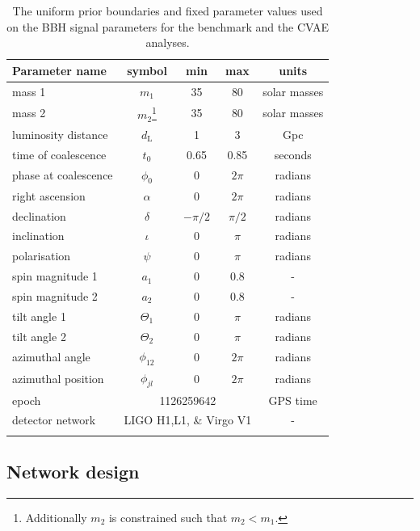 \documentclass[%
showpacs,
nofootinbib,
 amsmath,amssymb,
 aps,
 twocolumn,
 prl,
 reprint,
floatfix,
]{revtex4-1}
\begin{document}
%
%
\begin{table}
\centering
\caption{The uniform prior boundaries and fixed parameter values used on the \ac{BBH} signal parameters for the benchmark
and the \ac{CVAE} analyses.}
\begin{tabular}[t]{lcccc}
\toprule
Parameter name & symbol & min & max & units \\
\hline
mass 1 & $m_1$ & 35 & 80 & solar masses \\
mass 2 & $m_2$\footnote{Additionally $m_2$ is constrained such that
$m_{2}<m_{1}$.} & 35 & 80 & solar masses \\
luminosity distance & $d_{\text{L}}$ & 1 & 3 & Gpc \\
time of coalescence & $t_{0}$ & 0.65 & 0.85 & seconds \\
phase at coalescence & $\phi_{0}$ & 0 & $2\pi$ & radians \\
right ascension & $\alpha$ & 0 & $2\pi$ & radians \\
declination & $\delta$ & $-\pi/2$ & $\pi/2$ & radians \\
inclination & $\iota$ & 0 & $\pi$ & radians \\
polarisation & $\psi$ & 0 & $\pi$ & radians \\
spin magnitude 1 & $a_1$ & 0 & 0.8 & - \\
spin magnitude 2 & $a_2$ & 0 & 0.8 & - \\
tilt angle 1 & $\Theta_1$ & 0 & $\pi$ & radians \\
tilt angle 2 & $\Theta_2$ & 0 & $\pi$ & radians \\
azimuthal angle & $\phi_{12}$ & 0 & $2\pi$ & radians \\
azimuthal position & $\phi_{jl}$ & 0 & $2\pi$ & radians \\
\hline
epoch & \multicolumn{3}{c}{1126259642} & GPS time \\
detector network & \multicolumn{3}{c}{LIGO H1,L1, \& Virgo V1} & - \\
\botrule
\end{tabular}
\label{tab:prior_ranges}
\end{table}

\subsection{Network design}\label{sec:network_design}
%
%
\end{document}
